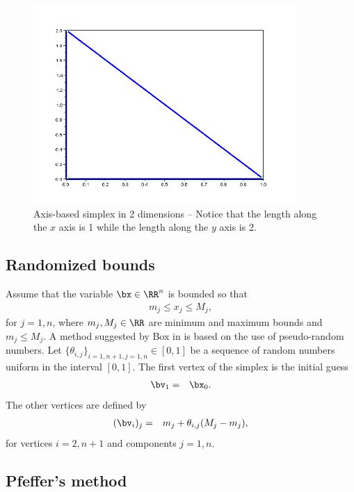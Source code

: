 \begin{figure}
\begin{center}
\includegraphics[width=10cm]{simplextheory/simplex_axes.png}
\end{center}
\caption{Axis-based simplex in 2 dimensions -- Notice that the length along the $x$ axis is 1 while the length
along the $y$ axis is 2. }
\label{fig-nm-simplex-axes}
\end{figure}

\subsection{Randomized bounds}

Assume that the variable $\bx\in\RR^n$ is bounded so that 
\begin{eqnarray}
m_j \leq x_j \leq M_j,
\end{eqnarray}
for $j=1,n$, where $m_j,M_j\in\RR$ are minimum 
and maximum bounds and $m_j\leq M_j$.
A method suggested by Box in \cite{Box1965} is 
based on the use of 
pseudo-random numbers. Let 
$\{\theta_{i,j}\}_{i=1,n+1,j=1,n}\in[0,1]$ be 
a sequence of random numbers uniform in the 
interval $[0,1]$.
The first vertex of the simplex is the initial guess 
\begin{eqnarray}
\bv_1 &=& \bx_0.
\end{eqnarray}
The other vertices are defined by 
\begin{eqnarray}
(\bv_i)_j &=& m_j + \theta_{i,j} (M_j - m_j),
\end{eqnarray}
for vertices $i=2,n+1$ and components $j=1,n$.

\subsection{Pfeffer's method}

